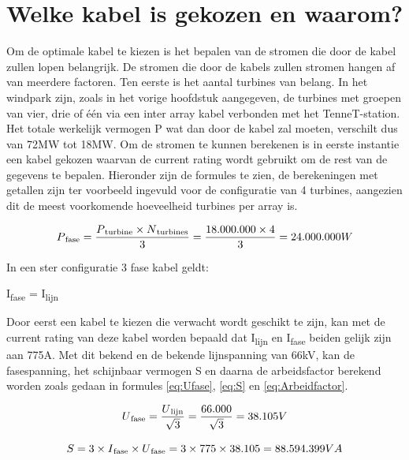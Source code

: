 \section{Welke kabel is gekozen en waarom?}

Om de optimale kabel te kiezen is het bepalen van de stromen die door de kabel zullen lopen belangrijk. De stromen die door de kabels zullen stromen hangen af van meerdere factoren. Ten eerste is het aantal turbines van belang. In het windpark zijn, zoals in het vorige hoofdstuk aangegeven, de turbines met groepen van vier, drie of één via een inter array kabel verbonden met het TenneT-station. Het totale werkelijk vermogen P wat dan door de kabel zal moeten, verschilt dus van 72MW tot 18MW. Om de stromen te kunnen berekenen is in eerste instantie een kabel gekozen waarvan de current rating wordt gebruikt om de rest van de gegevens te bepalen. Hieronder zijn de formules te zien, de berekeningen met getallen zijn ter voorbeeld ingevuld voor de configuratie van 4 turbines, aangezien dit de meest voorkomende hoeveelheid turbines per array is.   

\begin{equation} \label{eq:Pfase}
P\textsubscript{fase} = \frac{P\textsubscript{turbine} \times N\textsubscript{turbines}}{3} = \frac{18.000.000 \times 4}{3} = 24.000.000W
\end{equation} 

In een ster configuratie 3 fase kabel geldt: 

I\textsubscript{fase} = I\textsubscript{lijn}

Door eerst een kabel te kiezen die verwacht wordt geschikt te zijn, kan met de current rating van deze kabel worden bepaald dat I\textsubscript{lijn} en I\textsubscript{fase} beiden gelijk zijn aan 775A. Met dit bekend en de bekende lijnspanning van 66kV, kan de fasespanning, het schijnbaar vermogen S en daarna de arbeidsfactor berekend worden zoals gedaan in formules \ref{eq:Ufase}, \ref{eq:S} en \ref{eq:Arbeidfactor}.\cite{Technische_Aspecten_Presentatie}\cite{Three_phase_calculator}

\begin{equation} \label{eq:Ufase}
U\textsubscript{fase} = \frac{U\textsubscript{lijn}}{\sqrt{3}} = \frac{66.000}{\sqrt{3}} = 38.105V
\end{equation} 

\begin{equation} \label{eq:S}
S = 3 \times I\textsubscript{fase} \times U\textsubscript{fase} = 3 \times 775 \times 38.105 = 88.594.399VA
\end{equation}

